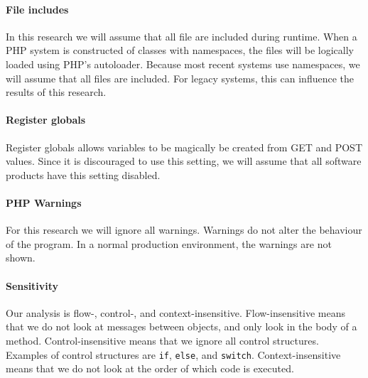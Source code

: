 \documentclass[../main.tex]{subfiles}
\begin{document}
    \paragraph{File includes}
    In this research we will assume that all file are included during runtime. 
    When a PHP system is constructed of classes with namespaces, the files will be logically loaded using PHP's autoloader.
    Because most recent systems use namespaces, we will assume that all files are included.
    For legacy systems, this can influence the results of this research.
    
    \paragraph{Register globals}
    Register globals allows variables to be magically be created from GET and POST values.
    Since it is discouraged to use this setting, we will assume that all software products have this setting disabled.
    
    \paragraph{PHP Warnings}
    For this research we will ignore all warnings.
    Warnings do not alter the behaviour of the program.
    In a normal production environment, the warnings are not shown.
    
    \paragraph{Sensitivity}
    Our analysis is flow-, control-, and context-insensitive.
    Flow-insensitive means that we do not look at messages between objects, and only look in the body of a method.
    Control-insensitive means that we ignore all control structures. 
    Examples of control structures are \texttt{if}, \texttt{else}, and \texttt{switch}.
    Context-insensitive means that we do not look at the order of which code is executed.
    
    
\end{document}
